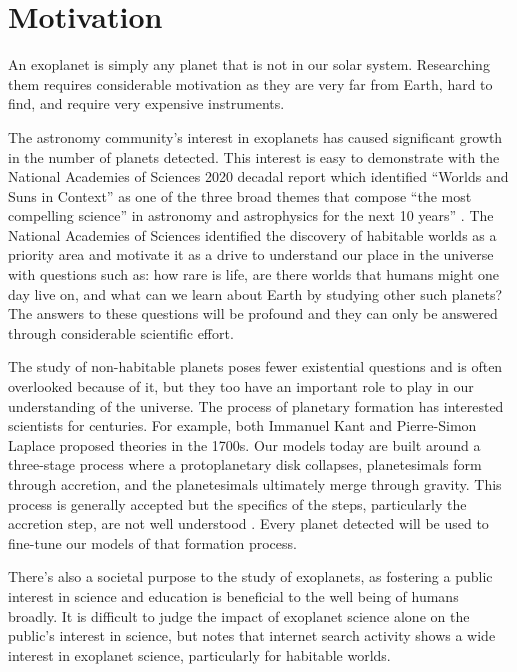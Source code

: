 \section{Motivation}
\label{sec:motivation}

An exoplanet is simply any planet that is not in our solar system. Researching
them requires considerable motivation as they are very far from Earth,
hard to find, and require very expensive instruments. 

The astronomy community's interest in exoplanets has caused significant growth
in the number of planets detected. This interest is easy to demonstrate with
the National Academies of Sciences 2020 decadal report which identified
``Worlds and Suns in Context'' as one of the three broad themes that compose
``the most compelling science'' in astronomy and astrophysics for the next 10
years'' \citep{nationalacademiesofsciencesPathwaysDiscoveryAstronomy2021}. The
National Academies of Sciences identified the discovery of habitable worlds as
a priority area and motivate it as a drive to understand our place in the
universe with questions such as: how rare is life, are there worlds that humans
might one day live on, and what can we learn about Earth by studying other such
planets? The answers to these questions will be profound and they can only be
answered through considerable scientific effort.

The study of non-habitable planets poses fewer existential questions and is
often overlooked because of it, but they too have an important role to play in
our understanding of the universe. The process of planetary formation has
interested scientists for centuries. For example, both Immanuel Kant and
Pierre-Simon Laplace proposed theories \citep{Perryman2018a} in the 1700s. Our
models today are built around a three-stage process where a protoplanetary disk
collapses, planetesimals form through accretion, and the planetesimals
ultimately merge through gravity\citep{Jeffery}. This process is generally
accepted but the specifics of the steps, particularly the accretion step, are
not well understood \citep{Perryman2018a}. Every planet detected will be used
to fine-tune our models of that formation process.

There's also a societal purpose to the study of exoplanets, as fostering a
public interest in science and education is beneficial to the well being of
humans broadly. It is difficult to judge the impact of exoplanet science alone
on the public's interest in science, but \citet{deegImpactExoplanet2018} notes
that internet search activity shows a wide interest in exoplanet science,
particularly for habitable worlds.

